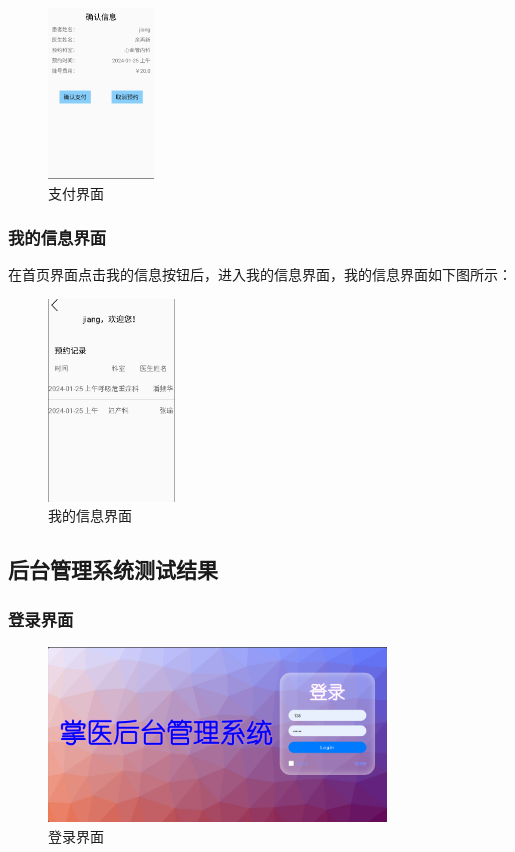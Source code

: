 \documentclass[UTF8,12pt]{article}
\begin{document}
\newpage

\begin{figure}[htbp]
    \centering
    \includegraphics[width=0.25\textwidth]{imgs/25.png}
    \caption{支付界面}
\end{figure}

\subsubsection{我的信息界面}

在首页界面点击我的信息按钮后，进入我的信息界面，我的信息界面如下图所示：

\begin{figure}[htbp]
    \centering
    \includegraphics[width=0.3\textwidth]{imgs/26.png}
    \caption{我的信息界面}
\end{figure}

\newpage

\subsection{后台管理系统测试结果}

\subsubsection{登录界面}

\begin{figure}[htbp]
    \centering
    \includegraphics[width=0.8\textwidth]{imgs/33.png}
    \caption{登录界面}
\end{figure}
\end{document}
